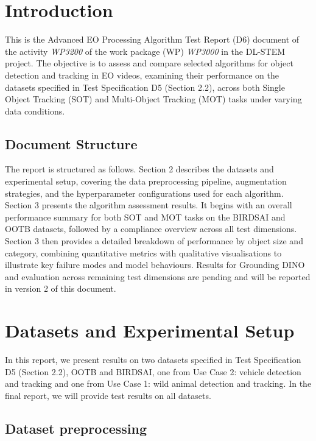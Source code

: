 \documentclass[11pt]{article}
\begin{document}
\newpage

\hypertarget{introduction}{%
\section{Introduction}\label{introduction}}

This is the Advanced EO Processing Algorithm Test Report (D6) document of the activity \emph{WP3200} of the work package (WP) \emph{WP3000} in the DL-STEM project.
The objective is to assess and compare selected algorithms for object detection and tracking in EO videos, examining their performance on the datasets specified in 
Test Specification D5 (Section 2.2), across both Single Object Tracking (SOT) and Multi-Object Tracking (MOT) tasks under varying data conditions.

\subsection{Document Structure}
The report is structured as follows. Section 2 describes the datasets and experimental setup, covering the data preprocessing pipeline, augmentation strategies, 
and the hyperparameter configurations used for each algorithm. Section 3 presents the algorithm assessment results. It begins with an overall performance summary 
for both SOT and MOT tasks on the BIRDSAI and OOTB datasets, followed by a compliance overview across all test dimensions. Section 3 then provides a detailed 
breakdown of performance by object size and category, combining quantitative metrics with qualitative visualisations to illustrate key failure modes and model behaviours. 
Results for Grounding DINO and evaluation across remaining test dimensions are pending and will be reported in version 2 of this document.

\hypertarget{Datasets and Experimental Setup}{%
\section{Datasets and Experimental Setup}\label{Experimental Setup}}

In this report, we present results on two datasets specified in Test Specification D5 
(Section 2.2), OOTB and BIRDSAI, one from Use Case 2: vehicle detection and tracking 
and one from Use Case 1: wild animal detection and tracking. 
In the final report, we will provide test results on all datasets.

\hypertarget{dataset-preprocessing}{%
\subsection{Dataset preprocessing}\label{dataset-preprocessing}}
\end{document}
